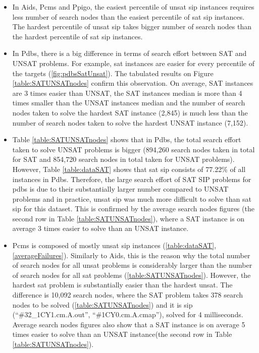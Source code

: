 \documentclass{l4proj}
\newcounter{example}[section]
\begin{document}
\begin{itemize}
\item In Aids, Pcms and Ppigo, the easiest percentile of \gls{unsat} \gls{sip} instances requires less number of search nodes than the easiest percentile of \gls{sat} \gls{sip} instances. The hardest percentile of \gls{unsat} \gls{sip} takes bigger number of search nodes than the hardest percentile of \gls{sat} \gls{sip} instances.

\item In Pdbs, there is a big difference in terms of search effort between SAT and UNSAT problems. For example, \gls{sat} instances are easier for every percentile of the targets (\ref{fig:pdbsSatUnsat}). The tabulated results on Figure \ref{table:SATUNSATnodes} confirm this observation. On average, SAT instances are 3 times easier than UNSAT, the SAT instances median is more than 4 times smaller than the UNSAT instances median and the number of search nodes taken to solve the hardest SAT instance (2,845) is much less than the number of search nodes taken to solve the hardest UNSAT instance (7,152).

\item Table \ref{table:SATUNSATnodes} shows that in Pdbs, the total search effort taken to solve UNSAT problems is bigger (894,260 search nodes taken in total for SAT and 854,720 search nodes in total taken for UNSAT problems). However, Table \ref{table:dataSAT} shows that \gls{sat} \gls{sip} consists of 77.22\% of all instances in Pdbs. Therefore, the large search effort of SAT SIP problems for pdbs is due to their substantially larger number compared to UNSAT problems and in practice, \gls{unsat} \gls{sip} was much more difficult to solve than \gls{sat} \gls{sip} for this dataset. This is confirmed by the average search nodes figures (the second row in Table \ref{table:SATUNSATnodes}), where a SAT instance is on average 3 times easier to solve than an UNSAT instance.

\item Pcms is composed of mostly \gls{unsat} \gls{sip} instances (\ref{table:dataSAT}, \ref{averageFailures}). Similarly to Aids, this is the reason why the total number of search nodes for all \gls{unsat} problems is considerably larger than the number of search nodes for all \gls{sat} problems (\ref{table:SATUNSATnodes}). However, the hardest \gls{sat} problem is substantially easier than the hardest \gls{unsat}. The difference is 10,092 search nodes, where the SAT problem takes 378 search nodes to be solved (\ref{table:SATUNSATnodes}) and it is \gls{sip} (``\#32\_1CY1.cm.A.out'', ``\#1CY0.cm.A.cmap''), solved for 4 milliseconds. Average search nodes figures also show that a SAT instance is on average 5 times easier to solve than an UNSAT instance(the second row in Table \ref{table:SATUNSATnodes}).


\end{itemize}
\end{document}
